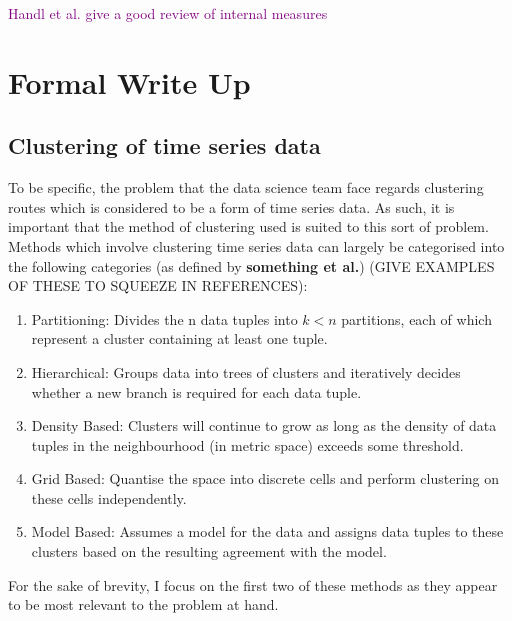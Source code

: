 \documentclass{report}
\newcommand\NOTE[1]{\textcolor{purple}{#1}}
\begin{document}
    \NOTE{Handl et al. give a good review of internal measures}


    \chapter{Formal Write Up}

    \section{Clustering of time series data}

    To be specific, the problem that the data science team face regards clustering routes which is considered to be a form of time series data. As such, it is important that the method of clustering used is suited to this sort of problem. Methods which involve clustering time series data can largely be categorised into the following categories (as defined by \textbf{something et al.}) (GIVE EXAMPLES OF THESE TO SQUEEZE IN REFERENCES):

    \begin{enumerate}
        \item Partitioning: Divides the n data tuples into $k < n$ partitions, each of which represent a cluster containing at least one tuple. 
        \item Hierarchical: Groups data into trees of clusters and iteratively decides whether a new branch is required for each data tuple.
        \item Density Based: Clusters will continue to grow as long as the density of data tuples in the neighbourhood (in metric space) exceeds some threshold.
        \item Grid Based: Quantise the space into discrete cells and perform clustering on these cells independently.
        \item Model Based: Assumes a model for the data and assigns data tuples to these clusters based on the resulting agreement with the model.
    \end{enumerate}

    For the sake of brevity, I focus on the first two of these methods as they appear to be most relevant to the problem at hand.
\end{document}
